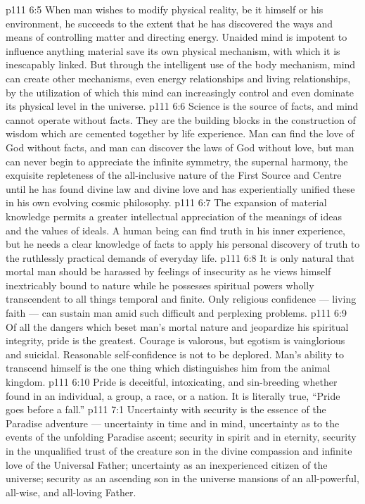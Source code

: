 \vs p111 6:5 When man wishes to modify physical reality, be it himself or his environment, he succeeds to the extent that he has discovered the ways and means of controlling matter and directing energy. Unaided mind is impotent to influence anything material save its own physical mechanism, with which it is inescapably linked. But through the intelligent use of the body mechanism, mind can create other mechanisms, even energy relationships and living relationships, by the utilization of which this mind can increasingly control and even dominate its physical level in the universe.
\vs p111 6:6 Science is the source of facts, and mind cannot operate without facts. They are the building blocks in the construction of wisdom which are cemented together by life experience. Man can find the love of God without facts, and man can discover the laws of God without love, but man can never begin to appreciate the infinite symmetry, the supernal harmony, the exquisite repleteness of the all\hyp{}inclusive nature of the First Source and Centre until he has found divine law and divine love and has experientially unified these in his own evolving cosmic philosophy.
\vs p111 6:7 The expansion of material knowledge permits a greater intellectual appreciation of the meanings of ideas and the values of ideals. A human being can find truth in his inner experience, but he needs a clear knowledge of facts to apply his personal discovery of truth to the ruthlessly practical demands of everyday life.
\vs p111 6:8 \pc It is only natural that mortal man should be harassed by feelings of insecurity as he views himself inextricably bound to nature while he possesses spiritual powers wholly transcendent to all things temporal and finite. Only religious confidence --- living faith --- can sustain man amid such difficult and perplexing problems.
\vs p111 6:9 \pc Of all the dangers which beset man’s mortal nature and jeopardize his spiritual integrity, pride is the greatest. Courage is valorous, but egotism is vainglorious and suicidal. Reasonable self\hyp{}confidence is not to be deplored. Man’s ability to transcend himself is the one thing which distinguishes him from the animal kingdom.
\vs p111 6:10 \pc Pride is deceitful, intoxicating, and sin\hyp{}breeding whether found in an individual, a group, a race, or a nation. It is literally true, “Pride goes before a fall.”
\vs p111 7:1 Uncertainty with security is the essence of the Paradise adventure --- uncertainty in time and in mind, uncertainty as to the events of the unfolding Paradise ascent; security in spirit and in eternity, security in the unqualified trust of the creature son in the divine compassion and infinite love of the Universal Father; uncertainty as an inexperienced citizen of the universe; security as an ascending son in the universe mansions of an all\hyp{}powerful, all\hyp{}wise, and all\hyp{}loving Father.
